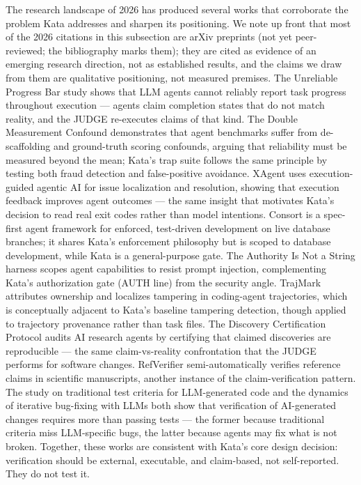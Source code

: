 \documentclass{sbc2019}%
\begin{document}
The research landscape of 2026 has produced several works that corroborate
the problem Kata addresses and sharpen its positioning. We note up front
that most of the 2026 citations in this subsection are arXiv preprints
(not yet peer-reviewed; the bibliography marks them); they are cited as
evidence of an emerging research direction, not as established results,
and the claims we draw from them are qualitative positioning, not
measured premises. The Unreliable
Progress Bar study \cite{unreliable-progress} shows that LLM agents cannot
reliably report task progress throughout execution --- agents claim
completion states that do not match reality, and the JUDGE re-executes
claims of that kind. The Double Measurement Confound
\cite{double-measurement} demonstrates that agent benchmarks suffer from
de-scaffolding and ground-truth scoring confounds, arguing that reliability
must be measured beyond the mean; Kata's trap suite follows the same
principle by testing both fraud detection and false-positive avoidance.
XAgent \cite{xagent} uses execution-guided agentic AI for issue
localization and resolution, showing that execution feedback improves agent
outcomes --- the same insight that motivates Kata's decision to read real
exit codes rather than model intentions. Consort \cite{consort} is a
spec-first agent framework for enforced, test-driven development on live
database branches; it shares Kata's enforcement philosophy but is scoped to
database development, while Kata is a general-purpose gate. The Authority
Is Not a String harness \cite{authority-harness} scopes agent capabilities
to resist prompt injection, complementing Kata's authorization gate (AUTH
line) from the security angle. TrajMark \cite{trajmark} attributes ownership
and localizes tampering in coding-agent trajectories, which is conceptually
adjacent to Kata's baseline tampering detection, though applied to
trajectory provenance rather than task files. The Discovery Certification
Protocol \cite{discovery-certification} audits AI research agents by
certifying that claimed discoveries are reproducible --- the same
claim-vs-reality confrontation that the JUDGE performs for software
changes. RefVerifier \cite{refverifier} semi-automatically verifies
reference claims in scientific manuscripts, another instance of the
claim-verification pattern. The study on traditional test criteria
for LLM-generated code \cite{test-criteria-llm} and the dynamics of
iterative bug-fixing with LLMs \cite{not-buggy} both show that verification
of AI-generated changes requires more than passing tests --- the former
because traditional criteria miss LLM-specific bugs, the latter because
agents may fix what is not broken. Together, these works are consistent with
Kata's core design decision: verification should be external, executable, and
claim-based, not self-reported. They do not test it.
\end{document}
